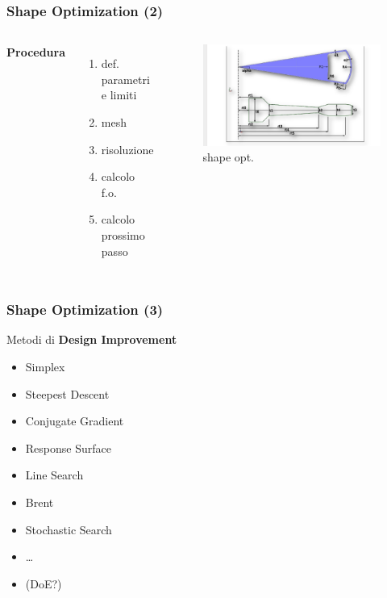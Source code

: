 \documentclass{beamer}
\begin{document}
\begin{frame}
	\frametitle{Shape Optimization (2)}
	\begin{columns}[c] %
		
		\textbf{Procedura}
		\begin{enumerate}
			\item def. parametri e limiti
			\item mesh
			\item risoluzione
			\item calcolo f.o.
			\item calcolo prossimo passo
		\end{enumerate}
		
		\begin{figure}
			\includegraphics[width=0.9\linewidth]{./images/shape.png}
			\caption{shape opt.}
			\label{fig:shape}
		\end{figure}
	\end{columns}
\end{frame}


\begin{frame}
	\frametitle{Shape Optimization (3)}
	Metodi di \textbf{Design Improvement}
	\begin{itemize}
		\item Simplex
		\item Steepest Descent
		\item Conjugate Gradient
		\item Response Surface
		\item Line Search
		\item Brent
		\item Stochastic Search
		\item \ldots
		\item (DoE?)
	\end{itemize}
\end{frame}
\end{document}
